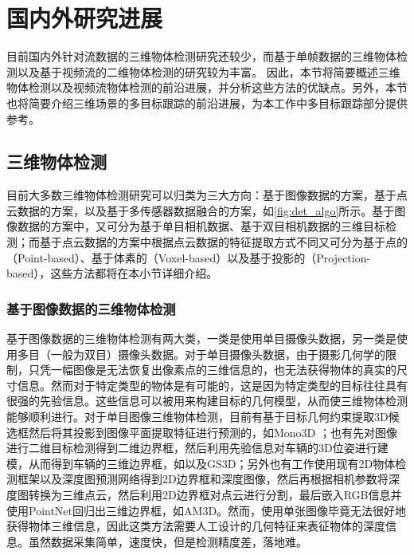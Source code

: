 \section{国内外研究进展}
\label{sec:realted_work}
目前国内外针对流数据的三维物体检测研究还较少，而基于单帧数据的三维物体检测以及基于视频流的二维物体检测的研究较为丰富。 因此，本节将简要概述三维物体检测以及视频流物体检测的前沿进展，并分析这些方法的优缺点。另外，本节也将简要介绍三维场景的多目标跟踪的前沿进展，为本工作中多目标跟踪部分提供参考。

\subsection{三维物体检测}
\label{3d_detect}
目前大多数三维物体检测研究可以归类为三大方向：基于图像数据的方案，基于点云数据的方案，以及基于多传感器数据融合的方案，如\figurename \ref{fig:det_algo}所示。基于图像数据的方案中，又可分为基于单目相机数据、基于双目相机数据的三维目标检测；而基于点云数据的方案中根据点云数据的特征提取方式不同又可分为基于点的（Point-based）、基于体素的（Voxel-based）以及基于投影的（Projection-based），这些方法都将在本小节详细介绍。



\subsubsection{基于图像数据的三维物体检测}

基于图像数据的三维物体检测有两大类，一类是使用单目摄像头数据，另一类是使用多目（一般为双目）摄像头数据。对于单目摄像头数据，由于摄影几何学的限制，只凭一幅图像是无法恢复出像素点的三维信息的，也无法获得物体的真实的尺寸信息。然而对于特定类型的物体是有可能的，这是因为特定类型的目标往往具有很强的先验信息。这些信息可以被用来构建目标的几何模型，从而使三维物体检测能够顺利进行。对于单目图像三维物体检测，目前有基于目标几何约束提取3D候选框然后将其投影到图像平面提取特征进行预测的，如Mono3D \cite{7780605}；也有先对图像进行二维目标检测得到二维边界框，然后利用先验信息对车辆的3D位姿进行建模，从而得到车辆的三维边界框，如\cite{Mousavian3D}以及GS3D\cite{li2019gs3d}；另外也有工作使用现有2D物体检测框架以及深度图预测网络得到2D边界框和深度图像，然后再根据相机参数将深度图转换为三维点云，然后利用2D边界框对点云进行分割，最后嵌入RGB信息并使用PointNet\cite{qi2017pointnet}回归出三维边界框，如AM3D\cite{ma2019accurate}。然而，使用单张图像毕竟无法很好地获得物体三维信息，因此这类方法需要人工设计的几何特征来表征物体的深度信息。虽然数据采集简单，速度快，但是检测精度差，落地难。


